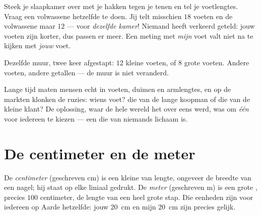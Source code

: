 \begin{example}\label{ex:g2:measuring-length:pace}
Steek je slaapkamer over met je hakken tegen je tenen en tel je
voetlengtes. Vraag een volwassene hetzelfde te doen. Jij telt
misschien $18$ voeten en de volwassene maar $12$ --- voor
\emph{dezelfde kamer}! Niemand heeft verkeerd geteld: jouw voeten zijn
korter, dus passen er meer. Een meting met \emph{mijn} voet valt niet
na te kijken met \emph{jouw} voet.
\end{example}

\begin{omfigure}

{\small Dezelfde muur, twee keer afgestapt: $12$ kleine voeten, of $8$
grote voeten. Andere voeten, andere getallen --- de muur is niet
veranderd.}
\end{omfigure}

\begin{remark}\label{rem:g2:measuring-length:argument}
Lange tijd maten mensen echt in voeten, duimen en armlengtes, en op de
markten klonken de ruzies: wiens voet? die van de lange koopman of die
van de kleine klant? De oplossing, waar de hele wereld het over eens
werd, was om \emph{één}  voor iedereen te kiezen --- een
 die van niemands lichaam is.
\end{remark}

\section{De centimeter en de meter}

\begin{definition}\label{def:g2:measuring-length:units}
De \emph{centimeter} (geschreven \unit{cm}) is een
kleine  van lengte, ongeveer de breedte van een nagel; hij
staat op elke liniaal gedrukt. De \emph{meter}
(geschreven \unit{m}) is een grote , precies $100$ centimeter,
de lengte van een heel grote stap. Die eenheden zijn voor iedereen op
Aarde hetzelfde: jouw \qty{20}{cm} en mijn \qty{20}{cm} zijn precies
gelijk.
\end{definition}

